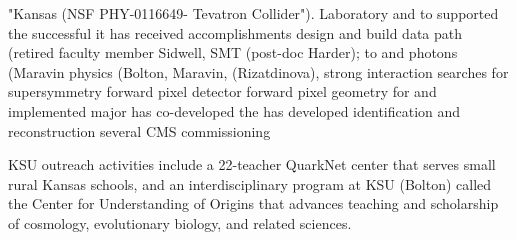 %
"Kansas 
(NSF  PHY-0116649- 
Tevatron Collider").
Laboratory  and to 
supported the successful
%
it has received 
accomplishments
design and build data path 
(retired faculty  member Sidwell, 
SMT  (post-doc  Harder);  to 
and photons (Maravin 
physics  (Bolton,  Maravin, 
(Rizatdinova), strong  interaction 
searches  for  supersymmetry 
forward  pixel  detector 
forward pixel geometry for
and  implemented  major 
has  co-developed the 
has  developed 
identification  and  reconstruction 
several CMS commissioning

KSU outreach activities include a 22-teacher QuarkNet center that serves 
small rural
Kansas schools, and an interdisciplinary program at KSU (Bolton) called 
the Center for Understanding of 
Origins that advances teaching and scholarship of  cosmology, evolutionary 
biology, and related 
sciences. 
